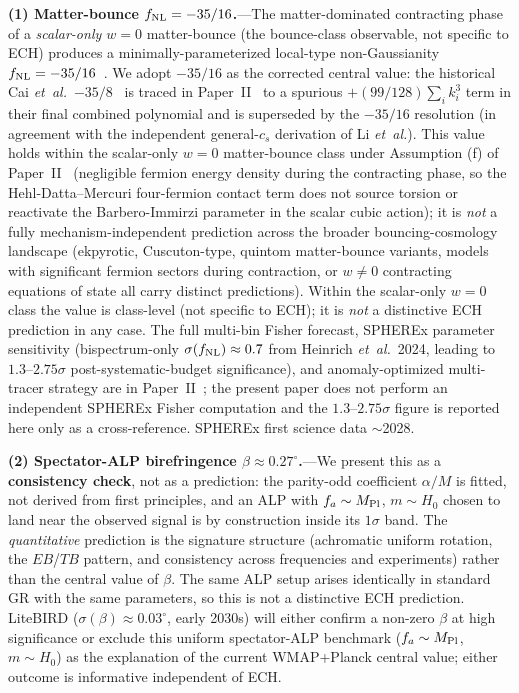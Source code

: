 \documentclass[aps,prd,twocolumn,superscriptaddress,showpacs,preprintnumbers,nofootinbib,longbibliography,floatfix]{revtex4-2}
\newcommand{\MPl}{M_{\rm Pl}}
\newcommand{\etal}{\textit{et~al.}}
\newcommand{\fnl}{f_{\rm NL}}
\begin{document}
\textbf{(1) Matter-bounce $\fnl=-35/16$.}---The matter-dominated contracting
phase of a \emph{scalar-only $w=0$} matter-bounce (the bounce-class
observable, not specific to ECH) produces a minimally-parameterized
local-type non-Gaussianity $\fnl = -35/16$~\cite{Cai:2009fn}. We adopt
$-35/16$ as the corrected central value: the historical Cai \etal\
$-35/8$~\cite{Cai:2009fn} is traced in Paper~II~\cite{Golden2026P2} to a
spurious $+(99/128)\sum_i k_i^3$ term in their final combined polynomial and is
superseded by the $-35/16$ resolution (in agreement with the independent
general-$c_s$ derivation of Li \etal). This value
holds within the scalar-only $w=0$ matter-bounce class under
Assumption (f) of Paper~II~\cite{Golden2026P2} (negligible fermion
energy density during the contracting phase, so the Hehl-Datta--Mercuri
four-fermion contact term does not source torsion or reactivate the
Barbero-Immirzi parameter in the scalar cubic action); it is
\emph{not} a fully mechanism-independent prediction across the broader
bouncing-cosmology landscape (ekpyrotic, Cuscuton-type, quintom
matter-bounce variants, models with significant fermion sectors during
contraction, or $w\neq 0$ contracting equations of state all carry
distinct predictions). Within the scalar-only $w=0$ class the value is
class-level (not specific to ECH); it is \emph{not} a distinctive ECH
prediction in any case. The full multi-bin Fisher forecast, SPHEREx
parameter sensitivity (bispectrum-only $\sigma(\fnl)\approx 0.7$ from
Heinrich \etal~2024, leading to $1.3$--$2.75\sigma$ post-systematic-budget
significance), and anomaly-optimized multi-tracer strategy are in
Paper~II~\cite{Golden2026P2}; the present paper does not perform an
independent SPHEREx Fisher computation and the $1.3$--$2.75\sigma$ figure is
reported here only as a cross-reference. SPHEREx first science data
$\sim$2028.

\textbf{(2) Spectator-ALP birefringence $\beta\approx 0.27^\circ$.}---We
present this as a \textbf{consistency check}, not as a prediction: the
parity-odd coefficient $\alpha/M$ is fitted, not derived from first
principles, and an ALP with $f_a\sim\MPl$, $m\sim H_0$ chosen to land near
the observed signal is by construction inside its $1\sigma$ band. The
\emph{quantitative} prediction is the signature structure (achromatic
uniform rotation, the $EB$/$TB$ pattern, and consistency across
frequencies and experiments) rather than the
central value of $\beta$. The same ALP setup arises identically in standard
GR with the same parameters, so this is not a distinctive ECH prediction.
LiteBIRD ($\sigma(\beta)\approx 0.03^\circ$, early 2030s) will either
confirm a non-zero $\beta$ at high significance or exclude this uniform
spectator-ALP benchmark ($f_a\sim\MPl$, $m\sim H_0$) as the explanation
of the current WMAP+Planck central value; either outcome is informative
independent of ECH.
\end{document}
